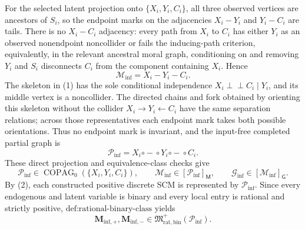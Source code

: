 For the selected latent projection onto \(\{X_i,Y_i,C_i\}\), all three observed vertices are ancestors of \(S_i\), so the endpoint marks on the adjacencies \(X_i-Y_i\) and \(Y_i-C_i\) are tails.  There is no \(X_i-C_i\) adjacency: every path from \(X_i\) to \(C_i\) has either \(Y_i\) as an observed nonendpoint noncollider or fails the inducing-path criterion, equivalently, in the relevant ancestral moral graph, conditioning on and removing \(Y_i\) and \(S_i\) disconnects \(C_i\) from the component containing \(X_i\).  Hence
\[
 \mathcal M_{\mathrm{inf}}=X_i-Y_i-C_i.                 \tag{1}
\]
The skeleton in (1) has the sole conditional independence \(X_i\mathbin{\perp\!\!\!\perp}C_i\mid Y_i\), and its middle vertex is a noncollider.  The directed chains and fork obtained by orienting this skeleton without the collider \(X_i\to Y_i\leftarrow C_i\) have the same separation relations; across those representatives each endpoint mark takes both possible orientations.  Thus no endpoint mark is invariant, and the input-free completed partial graph is
\[
 \mathcal P_{\mathrm{inf}}
 =X_i\mathbin{\circ\!-\!\circ}Y_i
       \mathbin{\circ\!-\!\circ}C_i.
\]
These direct projection and equivalence-class checks give
\[
 \mathcal P_{\mathrm{inf}}\in\operatorname{COPAG}_0(\{X_i,Y_i,C_i\}),
 \qquad \mathcal M_{\mathrm{inf}}\in[\mathcal P_{\mathrm{inf}}]_{\mathsf M},
 \qquad \mathcal G_{\mathrm{inf}}\in[\mathcal M_{\mathrm{inf}}]_{\mathsf G}. \tag{2}
\]
By (2), each constructed positive discrete SCM is represented by \(\mathcal P_{\mathrm{inf}}\).  Since every endogenous and latent variable is binary and every local entry is rational and strictly positive, \(\text{def:rational-binary-class}\) yields
\[
 \mathbf M_{\mathrm{inf},+},\mathbf M_{\mathrm{inf},-}
 \in\mathfrak M_{\mathrm{rat,bin}}^+(\mathcal P_{\mathrm{inf}}). \tag{3}
\]

